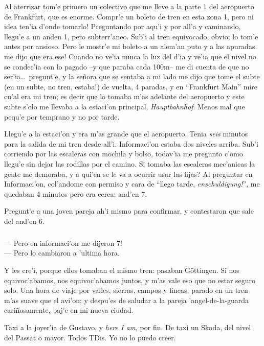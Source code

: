 Al aterrizar tom'e primero un colectivo que me lleve a la parte 1 del aeropuerto
de Frankfurt, que es enorme. Compr'e un boleto de tren en esta zona 1,
\textexclamdown pero ni idea ten'ia d'onde tomarlo! Preguntando por aqu'i y
por all'a y caminando, llegu'e a un anden 1, pero subterr'aneo. Sub'i al tren
equivocado, obvio; lo tom'e antes por ansioso. \textexclamdown Pero le mostr'e
mi boleto a un alem'an puto y a las apuradas me dijo que era ese! Cuando no
ve'ia nunca la luz del d'ia y ve'ia que el nivel no se condec'ia con lo pagado
--y que paraba cada 100m-- me di cuenta de que no ser'ia\ldots\ pregunt'e, y la
se\~nora que se sentaba a mi lado me dijo que tome el subte (\textexclamdown en
un subte, no tren, estaba!) de vuelta, 4 paradas, y en ``Frankfurt Main'' mire
cu'al era mi tren; es decir que lo tomaba m'as adelante del aeropuerto y este
subte s'olo me llevaba a la estaci'on principal, \emph{Hauptbahnhof}. Menos mal
que pequ'e por temprano y no por tarde.

Llegu'e a la estaci'on y era m'as grande que el aeropuerto. Tenia \emph{seis}
minutos para la salida de mi tren desde all'i. Informaci'on estaba dos niveles
arriba. Sub'i corriendo por las escaleras con mochila y bolso, todav'ia me
pregunto c'omo llegu'e sin dejar las rodillas por el camino. Si tomaba las
escaleras mec'anicas la gente me demoraba, \textquestiondown y a qui'en se le va
a ocurrir usar las fijas? Al preguntar en Informaci'on, col'andome con permiso
y cara de ``llego tarde, \emph{\textexclamdown enschuldigung!}'', me quedaban 4
minutos pero era cerca: and'en 7.

Pregunt'e a una joven pareja ah'i mismo para confirmar, y contestaron que sale
del and'en 6.

\subparagraph{}\label{ssub:AngeldelaGuarda} --- \textexclamdown Pero en
informaci'on me dijeron 7!\\ --- Pero lo cambiaron a 'ultima hora.\\
\hangindent=1cm

Y les cre'i, porque ellos tomaban el mismo tren: pasaban G\"ottingen. Si nos
equivoc'abamos, nos equivoc'abamos juntos, y m'as vale eso que no estar seguro
solo. Una hora de viaje por valles, sierras, campos y fincas, parado en un tren
m'as suave que el avi'on; y despu'es de saludar a la pareja 'angel-de-la-guarda
cari\~nosamente, baj'e en mi nueva ciudad.

Taxi a la joyer'ia de Gustavo, y \emph{here I am}, por fin. De taxi un Skoda,
del nivel del Passat o mayor. Todos {\small TD}is. Yo no lo puedo creer.

